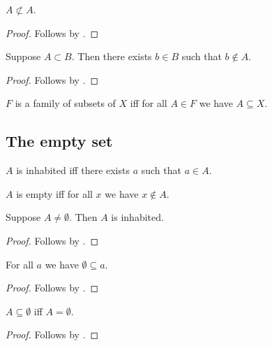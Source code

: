 \begin{proposition}\label{subset_irrefl}
    $A\not\subset A$.
\end{proposition}
\begin{proof}
    Follows by .
\end{proof}

\begin{proposition}\label{subset_witness}
    Suppose $A\subset B$.
    Then there exists $b\in B$ such that $b\notin A$.
\end{proposition}
\begin{proof}
    Follows by .
\end{proof}

\begin{abbreviation}\label{family_of_subsets}
    $F$ is a family of subsets of $X$ iff
    for all $A\in F$ we have $A\subseteq X$.
\end{abbreviation}


\subsection{The empty set}

\begin{abbreviation}\label{inhabited}
    $A$ is inhabited iff
    there exists $a$ such that $a\in A$.
\end{abbreviation}

\begin{abbreviation}\label{empty}
    $A$ is empty iff for all $x$ we have $x\notin A$.
\end{abbreviation}

\begin{proposition}\label{nonempty_inhabited}
    Suppose $A\neq\emptyset$. Then $A$ is inhabited.
\end{proposition}
\begin{proof}
    Follows by .
\end{proof}

\begin{proposition}\label{emptyset_subseteq}
    For all $a$ we have $\emptyset \subseteq a$.
\end{proposition}
\begin{proof}
    Follows by .
\end{proof}

\begin{proposition}%
\label{subseteq_emptyset_iff}
    $A\subseteq \emptyset$ iff $A = \emptyset$.
\end{proposition}
\begin{proof}
    Follows by .
\end{proof}


